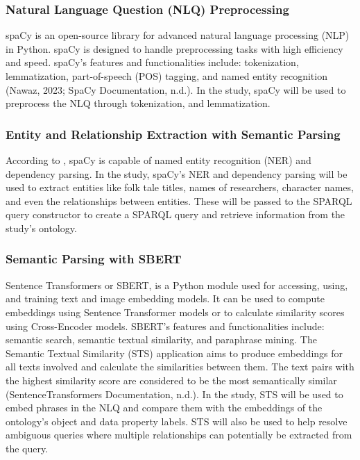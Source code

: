 \subsubsection{Natural Language Question (NLQ) Preprocessing}

spaCy is an open-source library for advanced natural language processing (NLP) in Python. spaCy is designed to handle preprocessing tasks with high efficiency and speed. spaCy’s features and functionalities include: tokenization, lemmatization, part-of-speech (POS) tagging, and named entity recognition (Nawaz,
2023; SpaCy Documentation, n.d.). In the study, spaCy will be used to preprocess the NLQ through tokenization, and lemmatization. 

\subsubsection{Entity and Relationship Extraction with Semantic Parsing}

According to , spaCy is capable of named entity recognition (NER) and dependency parsing. In the study, spaCy’s NER and dependency parsing will be used to extract entities like folk tale titles, names of researchers, character names, and even the relationships between entities. These will  be passed to the SPARQL query constructor to create a SPARQL query and retrieve information from the study’s ontology. 

\subsubsection{Semantic Parsing with SBERT}

Sentence Transformers or SBERT,  is a Python module used for accessing, using, and training text and image embedding models. It can be used to compute embeddings using Sentence Transformer models or to calculate similarity scores using Cross-Encoder models. SBERT’s features and functionalities include: semantic search, semantic textual similarity, and paraphrase mining. The Semantic Textual Similarity (STS) application aims to  produce embeddings for all texts involved and calculate the similarities between them. The text pairs with the highest similarity score are considered to be the most semantically similar (SentenceTransformers Documentation, n.d.). In the study, STS will be used to embed phrases in the NLQ and compare them with the embeddings of the ontology’s object and data property labels. STS will also be used to help resolve ambiguous queries where multiple relationships can potentially be extracted from the query. 


